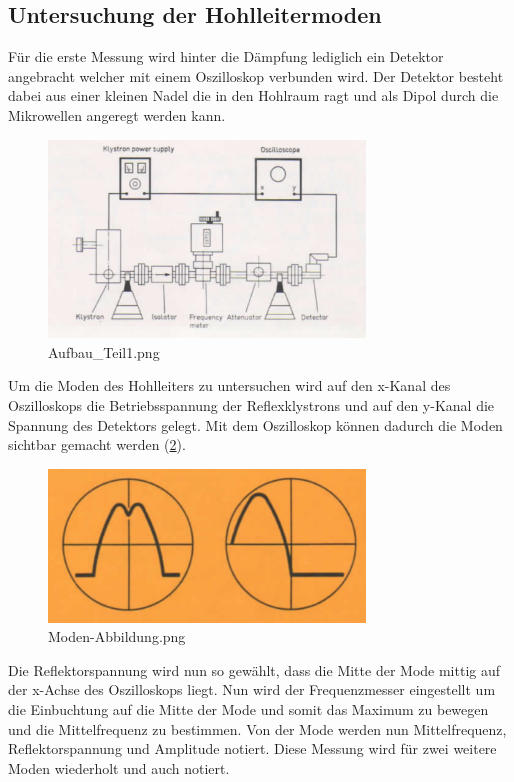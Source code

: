     \subsection{Untersuchung der Hohlleitermoden}
        Für die erste Messung wird hinter die Dämpfung lediglich ein Detektor angebracht welcher mit einem Oszilloskop verbunden wird.
        Der Detektor besteht dabei aus einer kleinen Nadel die in den Hohlraum ragt und als Dipol durch die Mikrowellen angeregt werden kann.
        \begin{figure}[H]
            \centering
            \includegraphics[width = 0.75\textwidth]{bilder/Aufbau_Teil1.png}
            \caption{Aufbau\_Teil1.png}
            \label{fig:Teil1}
        \end{figure}
        Um die Moden des Hohlleiters zu untersuchen wird auf den x-Kanal des Oszilloskops die Betriebsspannung der Reflexklystrons und auf den y-Kanal die Spannung des Detektors gelegt.
        Mit dem Oszilloskop können dadurch die Moden sichtbar gemacht werden (\ref{fig:Moden-Abbildung}).
        \begin{figure}[H]
            \centering
            \includegraphics[width = 0.75\textwidth]{bilder/Moden-Abbildung.png}
            \caption{Moden-Abbildung.png}
            \label{fig:Moden-Abbildung}
        \end{figure}
        Die Reflektorspannung wird nun so gewählt, dass die Mitte der Mode mittig auf der x-Achse des Oszilloskops liegt.
        Nun wird der Frequenzmesser eingestellt um die Einbuchtung auf die Mitte der Mode und somit das Maximum zu bewegen und die Mittelfrequenz zu bestimmen.
        Von der Mode werden nun Mittelfrequenz, Reflektorspannung und Amplitude notiert.
        Diese Messung wird für zwei weitere Moden wiederholt und auch notiert.

